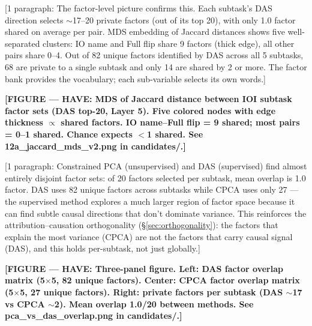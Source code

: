 \documentclass[11pt]{article}
\begin{document}
[1 paragraph: The factor-level picture confirms this. Each subtask's
DAS direction selects $\sim$17--20 private factors (out of its top 20),
with only 1.0 factor shared on average per pair. MDS embedding of
Jaccard distances shows five well-separated clusters: IO name and
Full flip share 9 factors (thick edge), all other pairs share 0--4.
Out of 82 unique factors identified by DAS across all 5 subtasks,
68 are private to a single subtask and only 14 are shared by 2 or more.
The factor bank provides the vocabulary; each sub-variable selects its
own words.]

\textbf{[FIGURE --- HAVE: MDS of Jaccard distance between IOI subtask
factor sets (DAS top-20, Layer 5). Five colored nodes with edge
thickness $\propto$ shared factors. IO name--Full flip = 9 shared;
most pairs = 0--1 shared. Chance expects $<$1 shared.
See 12a\_jaccard\_mds\_v2.png in candidates/.]}

[1 paragraph: Constrained PCA (unsupervised) and DAS (supervised) find
almost entirely disjoint factor sets: of 20 factors selected per subtask,
mean overlap is 1.0 factor. DAS uses 82 unique factors across subtasks
while CPCA uses only 27 --- the supervised method explores a much larger
region of factor space because it can find subtle causal directions
that don't dominate variance. This reinforces the attribution--causation
orthogonality (\S\ref{sec:orthogonality}): the factors that explain the
most variance (CPCA) are not the factors that carry causal signal (DAS),
and this holds per-subtask, not just globally.]

\textbf{[FIGURE --- HAVE: Three-panel figure. Left: DAS factor overlap
matrix (5$\times$5, 82 unique factors). Center: CPCA factor overlap
matrix (5$\times$5, 27 unique factors). Right: private factors per
subtask (DAS $\sim$17 vs CPCA $\sim$2). Mean overlap 1.0/20 between
methods. See pca\_vs\_das\_overlap.png in candidates/.]}

\end{document}
